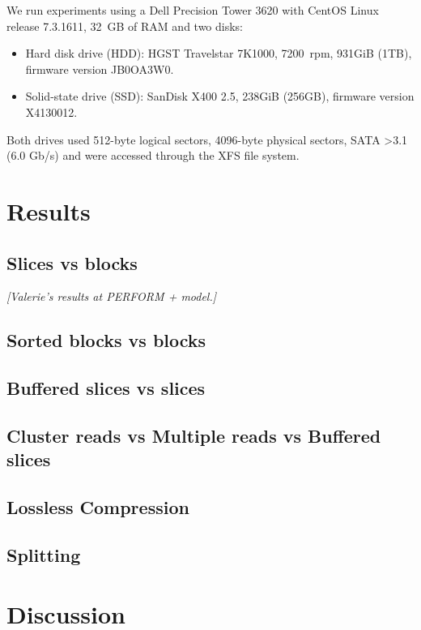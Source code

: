 \documentclass[10pt, conference, compsocconf]{IEEEtran}
\newcommand{\todo}[1]{
  \color{red}\emph{[#1]}
  \color{black}
}
\begin{document}
We run experiments using a Dell Precision Tower 3620 with CentOS Linux release
7.3.1611, 32~GB of RAM and two disks:
\begin{itemize}
  \item Hard disk drive (HDD): HGST Travelstar 7K1000, 7200~rpm, 931GiB (1TB), firmware version JB0OA3W0.
    \item Solid-state drive (SSD): SanDisk X400 2.5, 238GiB (256GB),
      firmware version X4130012.
\end{itemize}
Both drives used 512-byte logical sectors, 4096-byte physical sectors,
SATA >3.1 (6.0 Gb/s) and were accessed through the XFS file system.

\section{Results}
\label{sec:results}

\subsection{Slices vs blocks}

\todo{Valerie's results at PERFORM + model.}

\subsection{Sorted blocks vs blocks}

\subsection{Buffered slices vs slices}


\subsection{Cluster reads vs Multiple reads vs Buffered slices}


\subsection{Lossless Compression}

\subsection{Splitting}

\newpage

\section{Discussion}
\label{sec:discussion}
\end{document}
